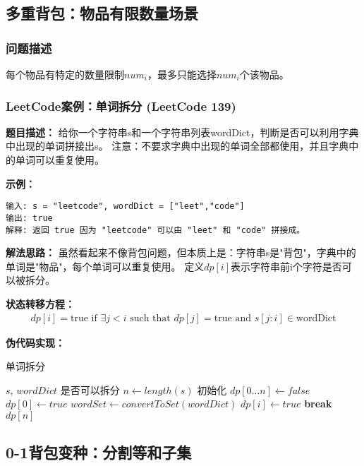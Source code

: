 \subsection{多重背包：物品有限数量场景}
\subsubsection{问题描述}
每个物品有特定的数量限制$num_i$，最多只能选择$num_i$个该物品。

\subsubsection{LeetCode案例：单词拆分 (LeetCode 139)}
\textbf{题目描述：}
给你一个字符串s和一个字符串列表wordDict，判断是否可以利用字典中出现的单词拼接出s。
注意：不要求字典中出现的单词全部都使用，并且字典中的单词可以重复使用。

\textbf{示例：}
\begin{verbatim}
输入: s = "leetcode", wordDict = ["leet","code"]
输出: true
解释: 返回 true 因为 "leetcode" 可以由 "leet" 和 "code" 拼接成。
\end{verbatim}

\textbf{解法思路：}
虽然看起来不像背包问题，但本质上是：字符串s是"背包"，字典中的单词是"物品"，每个单词可以重复使用。
定义$dp[i]$表示字符串前i个字符是否可以被拆分。

\textbf{状态转移方程：}
\begin{align}
dp[i] = \text{true if } \exists j < i \text{ such that } dp[j] = \text{true and } s[j:i] \in \text{wordDict}
\end{align}

\textbf{伪代码实现：}
\begin{algorithm}
\caption{单词拆分}
\begin{algorithmic}[1]
\REQUIRE $s$, $wordDict$
\ENSURE 是否可以拆分
\STATE $n \leftarrow length(s)$
\STATE 初始化 $dp[0...n] \leftarrow false$
\STATE $dp[0] \leftarrow true$
\STATE $wordSet \leftarrow convertToSet(wordDict)$
            \STATE $dp[i] \leftarrow true$
            \STATE \textbf{break}
        \ENDIF
    \ENDFOR
\ENDFOR
\RETURN $dp[n]$
\end{algorithmic}
\end{algorithm}

\subsection{0-1背包变种：分割等和子集}
